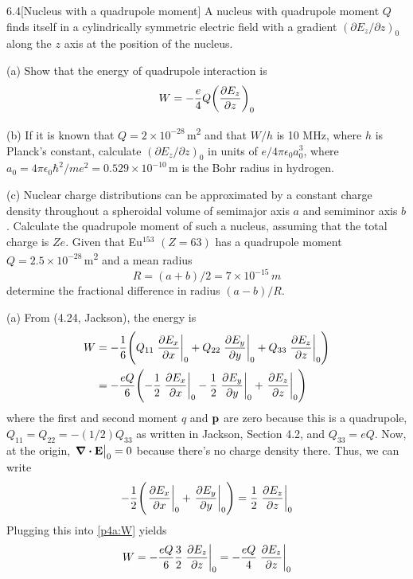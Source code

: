 \documentclass[12pt]{article}
\begin{document}
\begin{problem}{6.4}[Nucleus with a quadrupole moment]
A nucleus with quadrupole moment $Q$ finds itself in a cylindrically symmetric
electric field with a gradient $(\partial E_z /\partial z)_0$ along the $z$ axis
at the position of the nucleus.

(a) Show that the energy of quadrupole interaction is
\begin{equation}
    W=-\frac{e}{4}Q\qty(\frac{\partial E_z}{\partial z})_0 
\end{equation}

(b) If it is known that $Q=2\times 10^{-28}$\,\si{m\tothe{2}} and that $W /h$ is
10 \si{MHz}, where $h$ is Planck's constant, calculate $(\partial E_z /\partial
z)_0$ in units of $e /4\pi\epsilon_0a_0^3$, where
$a_0=4\pi\epsilon_0\hbar^2/me^2=0.529\times 10^{-10}$\,\si{m} is the
Bohr radius in hydrogen.

(c) Nuclear charge distributions can be approximated by a constant charge
density throughout a spheroidal volume of semimajor axis $a$ and semiminor axis
$b$. Calculate the quadrupole moment of such a nucleus, assuming that the total
charge is $Ze$. Given that Eu$^{153}$ $(Z=63)$ has a quadrupole moment
$Q=2.5\times 10^{-28}$\,\si{m\tothe{2}} and a mean radius
\begin{equation}
    R=(a+b)/2=7\times10^{-15}\,\si{m} 
\end{equation}
determine the fractional difference in radius $(a-b) /R$.
\begin{solution}
(a) From (4.24, Jackson), the energy is
\begin{align}\label{p4a:W}
    W
    &=-\frac16\qty(
        Q_{11}\eval{\frac{\partial E_x}{\partial x}}_0
        +Q_{22}\eval{\frac{\partial E_y}{\partial y}}_0
        +Q_{33}\eval{\frac{\partial E_z}{\partial z}}_0
    )\notag\\
    &=-\frac{eQ}{6}\qty(
        -\frac12\eval{\frac{\partial E_x}{\partial x}}_0 
        -\frac12\eval{\frac{\partial E_y}{\partial y}}_0 
        +\eval{\frac{\partial E_z}{\partial z}}_0 
    )
\end{align}
where the first and second moment $q$ and $\vb{p}$ are zero because this is a
quadrupole, $Q_{11}=Q_{22}=-(1 /2)Q_{33}$ as written in Jackson, Section 4.2,
and $Q_{33}=eQ$. Now, at the origin, $\eval{\div{\vb{E}}}_0=0$ because there's 
no charge density there. Thus, we can write
\begin{equation}
    -\frac12\qty(\eval{\frac{\partial E_x}{\partial
    x}}_0+\eval{\frac{\partial E_y}{\partial
    y}}_0)=\frac12\eval{\frac{\partial E_z}{\partial z}}_0 
\end{equation}
Plugging this into \eqref{p4a:W} yields
\begin{equation}\label{p4a:W2}
    W=-\frac{eQ}{6}\frac32\eval{\frac{\partial E_z}{\partial z}}_0 
    =-\frac{eQ}{4}\eval{\frac{\partial E_z}{\partial z}}_0
\end{equation}


\end{solution}
\end{problem}
\end{document}
